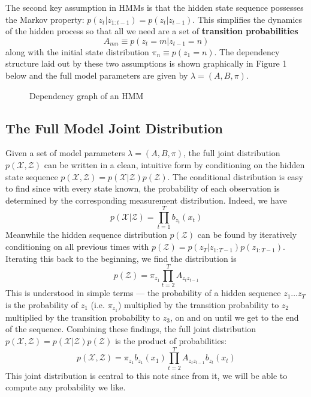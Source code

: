 \documentclass[onecolumn]{gwclass}
\begin{document}
	The second key assumption in HMMs is that the hidden state sequence possesses the Markov property: $ p(z_t|z_{1:{t-1}}) = p(z_t|z_{t-1}) $. This simplifies the dynamics of the hidden process so that all we need are a set of \textbf{transition probabilities} $$A_{mn}\equiv p(z_t=m|z_{t-1}=n)$$
	along with the initial state distribution $\pi_n\equiv p(z_1=n)$. The dependency structure laid out by these two assumptions is shown graphically in Figure 1 below and the full model parameters are given by $\lambda=(A,B,\pi)$.
	\begin{figure}[h!]
		\centering
		\caption{Dependency graph of an HMM}
	\end{figure}
	
	\subsection{The Full Model Joint Distribution}
	Given a set of model parameters $\lambda=(A,B,\pi)$, the full joint distribution $p(\mathcal{X},\mathcal{Z})$ can be written in a clean, intuitive form by conditioning on the hidden state sequence $ p(\mathcal{X},\mathcal{Z}) = p(\mathcal{X}|\mathcal{Z}) p(\mathcal{Z}) $.
	The conditional distribution is easy to find since with every state known, the probability of each observation is determined by the corresponding measurement distribution. Indeed, we have 
	$$p(\mathcal{X}|\mathcal{Z}) = \prod_{t=1}^T b_{z_t}(x_t)$$ Meanwhile the hidden sequence distribution $p(\mathcal{Z})$ can be found by iteratively conditioning on all previous times with $p(\mathcal{Z})=p(z_T|z_{1:T-1})p(z_{1:T-1})$. Iterating this back to the beginning, we find the distribution is 
	$$p(\mathcal{Z}) = \pi_{z_1}\prod_{t=2}^T A_{z_tz_{t-1}}$$ This is understood in simple terms --- the probability of a hidden sequence $z_1\dots z_T$ is the probability of $z_1$ (i.e. $\pi_{z_1}$) multiplied by the transition probability to $z_2$ multiplied by the transition probability to $z_3$, on and on until we get to the end of the sequence. Combining these findings, the full joint distribution $p(\mathcal{X},\mathcal{Z}) = p(\mathcal{X}|\mathcal{Z})p(\mathcal{Z})$ is the product of probabilities:
	$$ p(\mathcal{X},\mathcal{Z}) = \pi_{z_1}b_{z_1}(x_1) \prod_{t=2}^T A_{z_tz_{t-1}}b_{z_t}(x_t)$$
	This joint distribution is central to this note since from it, we will be able to compute any probability we like.
	
\end{document}

